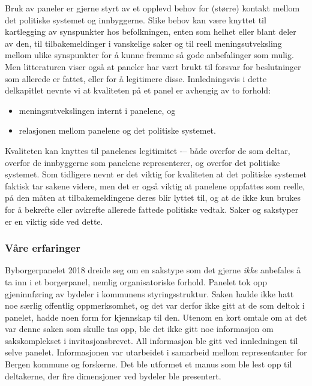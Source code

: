 \documentclass[
  12pt,
  a4paper, 12pt]{article}
\providecommand{\tightlist}{%
  \setlength{\itemsep}{0pt}\setlength{\parskip}{0pt}}
\begin{document}
Bruk av paneler er gjerne styrt av et opplevd behov for (større) kontakt mellom det politiske systemet og innbyggerne. Slike behov kan være knyttet til kartlegging av synspunkter hos befolkningen, enten som helhet eller blant deler av den, til tilbakemeldinger i vanskelige saker og til reell meningsutveksling mellom ulike synspunkter for å kunne fremme så gode anbefalinger som mulig. Men litteraturen viser også at paneler har vært brukt til forsvar for beslutninger som allerede er fattet, eller for å legitimere disse. Innledningsvis i dette delkapitlet nevnte vi at kvaliteten på et panel er avhengig av to forhold:

\begin{itemize}
\tightlist
\item
  meningsutvekslingen internt i panelene, og\\
\item
  relasjonen mellom panelene og det politiske systemet.
\end{itemize}

Kvaliteten kan knyttes til panelenes legitimitet -\/-- både overfor de som deltar, overfor de innbyggerne som panelene representerer, og overfor det politiske systemet. Som tidligere nevnt er det viktig for kvaliteten at det politiske systemet faktisk tar sakene videre, men det er også viktig at panelene oppfattes som reelle, på den måten at tilbakemeldingene deres blir lyttet til, og at de ikke kun brukes for å bekrefte eller avkrefte allerede fattede politiske vedtak. Saker og sakstyper er en viktig side ved dette.

\hypertarget{vuxe5re-erfaringer}{%
\subsubsection{Våre erfaringer}\label{vuxe5re-erfaringer}}

Byborgerpanelet 2018 dreide seg om en sakstype som det gjerne \emph{ikke} anbefales å ta inn i et borgerpanel, nemlig organisatoriske forhold. Panelet tok opp gjeninnføring av bydeler i kommunens styringsstruktur. Saken hadde ikke hatt noe særlig offentlig oppmerksomhet, og det var derfor ikke gitt at de som deltok i panelet, hadde noen form for kjennskap til den. Utenom en kort omtale om at det var denne saken som skulle tas opp, ble det ikke gitt noe informasjon om sakskomplekset i invitasjonsbrevet. All informasjon ble gitt ved innledningen til selve panelet. Informasjonen var utarbeidet i samarbeid mellom representanter for Bergen kommune og forskerne. Det ble utformet et manus som ble lest opp til deltakerne, der fire dimensjoner ved bydeler ble presentert.
\end{document}
